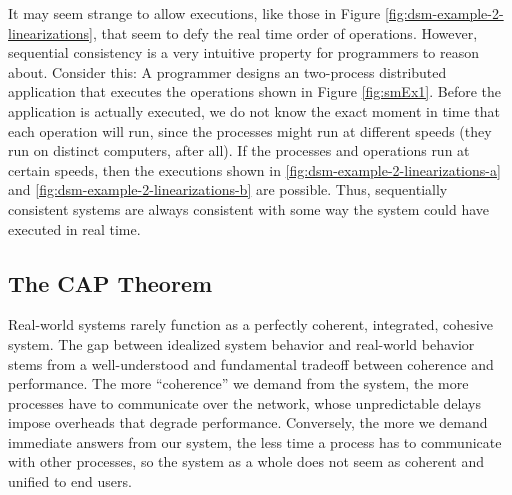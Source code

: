 \documentclass[]             %
{NASA}                       %
\theoremstyle{definition}
\begin{document}
It may seem strange to allow executions, like those in Figure
\ref{fig:dsm-example-2-linearizations}, that seem to defy the real
time order of operations. However, sequential consistency is a very
intuitive property for programmers to reason about. Consider this: A
programmer designs an two-process distributed application that
executes the operations shown in Figure \ref{fig:smEx1}. Before the
application is actually executed, we do not know the exact moment in
time that each operation will run, since the processes might run at
different speeds (they run on distinct computers, after all). If the
processes and operations run at certain speeds, then the executions
shown in \ref{fig:dsm-example-2-linearizations-a} and
\ref{fig:dsm-example-2-linearizations-b} are possible. Thus,
sequentially consistent systems are always consistent with some way
the system could have executed in real time.

\subsection{The CAP Theorem}
Real-world systems rarely function as a perfectly coherent,
integrated, cohesive system. The gap between idealized system behavior
and real-world behavior stems from a well-understood and fundamental
tradeoff between coherence and performance. The more ``coherence'' we
demand from the system, the more processes have to communicate over
the network, whose unpredictable delays impose overheads that degrade
performance. Conversely, the more we demand immediate answers from our
system, the less time a process has to communicate with other
processes, so the system as a whole does not seem as coherent and
unified to end users.
\end{document}
